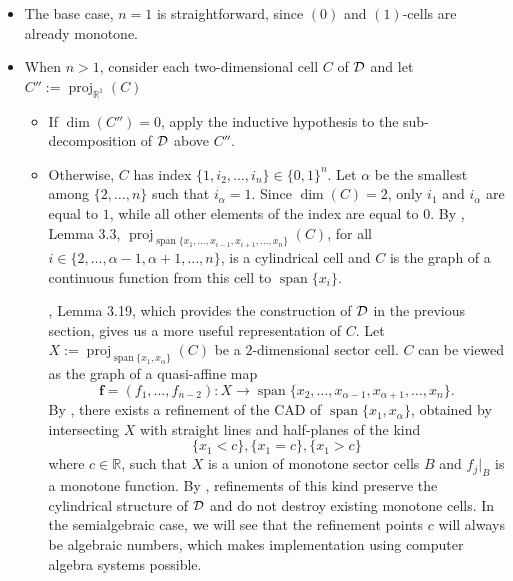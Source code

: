 \documentclass[
]{book}
\theoremstyle{definition}
\theoremstyle{definition}
\theoremstyle{definition}
\theoremstyle{definition}
\theoremstyle{remark}
\begin{document}
\begin{itemize}
\item
  The base case, \(n=1\) is straightforward, since \((0)\) and \((1)\)-cells are already monotone.
\item
  When \(n>1\), consider each two-dimensional cell \(C\) of \(\cal D\) and let \(C'' := {\operatorname{proj}_{\mathbb{R}^{1}}}(C)\)

  \begin{itemize}
  \item
    If \(\dim(C'') = 0\), apply the inductive hypothesis to the sub-decomposition of \(\cal D\) above \(C''\).
  \item
    Otherwise, \(C\) has index \(\{1,i_2,\dots,i_n\} \in \{0,1\}^n\). Let \(\alpha\) be the smallest among \(\{2,\dots,n\}\) such that \(i_\alpha = 1\). Since \(\dim(C) = 2\), only \(i_1\) and \(i_\alpha\) are equal to \(1\), while all other elements of the index are equal to \(0\). By \citet{bgv15}, Lemma 3.3, \({\operatorname{proj}_{{\operatorname{span} \{x_1,\ldots,x_{i-1},x_{i+1},\ldots,x_n\}}}}(C)\), for all \(i \in \{2,\ldots,\alpha-1,\alpha+1,\ldots,n\}\), is a cylindrical cell and \(C\) is the graph of a continuous function from this cell to \({\operatorname{span} \{x_i\}}\).

    \citet{bgv15}, Lemma 3.19, which provides the construction of \(\cal D\) in the previous section, gives us a more useful representation of \(C\). Let \(X := {\operatorname{proj}_{{\operatorname{span} \{x_1,x_\alpha\}}}}(C)\) be a \(2\)-dimensional sector cell. \(C\) can be viewed as the graph of a quasi-affine map
    \[
    \mathbf{f} = (f_1,\dots,f_{n-2}) : X \to {\operatorname{span} \{x_2,\ldots,x_{\alpha - 1}, x_{\alpha+1},\ldots,x_n\}}.
    \]
    By \citep[Lemma 3.18]{bgv15}, there exists a refinement of the CAD of \({\operatorname{span} \{x_1,x_\alpha\}}\), obtained by intersecting \(X\) with straight lines and half-planes of the kind
    \[
    \{x_1 < c\}, \{x_1 = c\}, \{x_1 > c\}
    \]
    where \(c \in \mathbb{R}\), such that \(X\) is a union of monotone sector cells \(B\) and \(f_j\vert_B\) is a monotone function.
    By \citep[ Lemma 3.11]{bgv15}, refinements of this kind preserve the cylindrical structure of \(\cal D\) and do not destroy existing monotone cells.
    In the semialgebraic case, we will see that the refinement points \(c\) will always be algebraic numbers, which makes implementation using computer algebra systems possible.
  \end{itemize}
\end{itemize}
\end{document}
